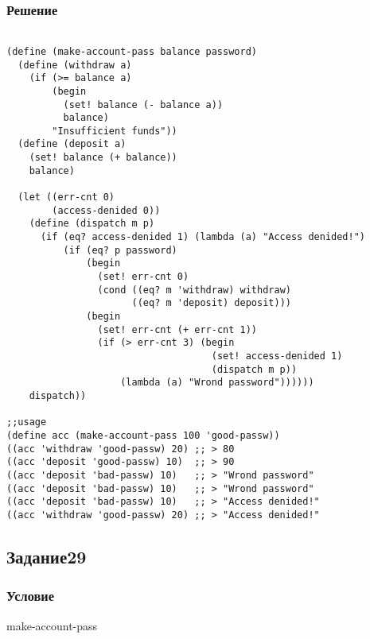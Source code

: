 \documentclass[10pt,a4paper]{article}
\begin{document}
\subsubsection*{Решение}
\begin{lstlisting}

(define (make-account-pass balance password)
  (define (withdraw a)
    (if (>= balance a)
        (begin
          (set! balance (- balance a))
          balance)
        "Insufficient funds"))
  (define (deposit a)
    (set! balance (+ balance))
    balance)
  
  (let ((err-cnt 0)
        (access-denided 0))
    (define (dispatch m p)
      (if (eq? access-denided 1) (lambda (a) "Access denided!")
          (if (eq? p password)
              (begin
                (set! err-cnt 0)
                (cond ((eq? m 'withdraw) withdraw)
                      ((eq? m 'deposit) deposit)))
              (begin
                (set! err-cnt (+ err-cnt 1))
                (if (> err-cnt 3) (begin
                                    (set! access-denided 1)
                                    (dispatch m p))
                    (lambda (a) "Wrond password"))))))
    dispatch))

;;usage
(define acc (make-account-pass 100 'good-passw))
((acc 'withdraw 'good-passw) 20) ;; > 80
((acc 'deposit 'good-passw) 10)  ;; > 90
((acc 'deposit 'bad-passw) 10)   ;; > "Wrond password"
((acc 'deposit 'bad-passw) 10)   ;; > "Wrond password"
((acc 'deposit 'bad-passw) 10)   ;; > "Access denided!"
((acc 'withdraw 'good-passw) 20) ;; > "Access denided!"
\end{lstlisting}

\subsection*{Задание29}
\subsubsection*{Условие}
make-account-pass
\end{document}
